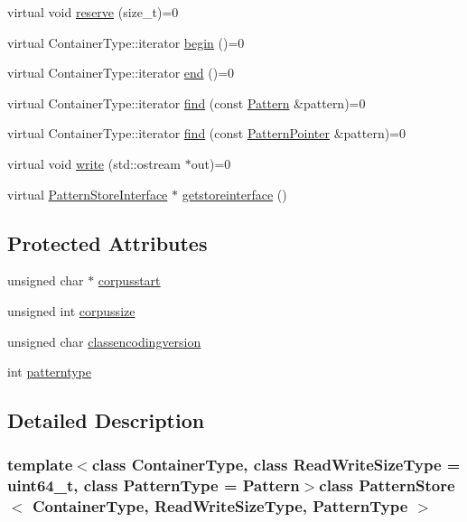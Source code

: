 \begin{DoxyCompactItemize}
\item 
virtual void \hyperlink{classPatternStore_afc995f7b88b6a31b700bb3bdb948b180}{reserve} (size\+\_\+t)=0
\item 
virtual Container\+Type\+::iterator \hyperlink{classPatternStore_aab3fab217b585b2b90a3fb3cc7065e11}{begin} ()=0
\item 
virtual Container\+Type\+::iterator \hyperlink{classPatternStore_ae697b6ba815e09fa300532a78e1c9077}{end} ()=0
\item 
virtual Container\+Type\+::iterator \hyperlink{classPatternStore_a6996798c63c2dd3ae3845848da35a6dd}{find} (const \hyperlink{classPattern}{Pattern} \&pattern)=0
\item 
virtual Container\+Type\+::iterator \hyperlink{classPatternStore_a33991d30a74b13a4264200474bf0542c}{find} (const \hyperlink{classPatternPointer}{Pattern\+Pointer} \&pattern)=0
\item 
virtual void \hyperlink{classPatternStore_a70d9b8faa5858ab7182cea7b1488a75c}{write} (std\+::ostream $\ast$out)=0
\item 
virtual \hyperlink{classPatternStoreInterface}{Pattern\+Store\+Interface} $\ast$ \hyperlink{classPatternStore_acd6094fb1e3fd4c655603dccdaed4c88}{getstoreinterface} ()
\end{DoxyCompactItemize}
\subsection*{Protected Attributes}
\begin{DoxyCompactItemize}
\item 
unsigned char $\ast$ \hyperlink{classPatternStore_a56811e603e5a5ce165a8709216f3f1c5}{corpusstart}
\item 
unsigned int \hyperlink{classPatternStore_aae8c0f162986134d629b0e6b1a63b4cc}{corpussize}
\item 
unsigned char \hyperlink{classPatternStore_a37f196867dede75f7a9bf72b07a3c24d}{classencodingversion}
\item 
int \hyperlink{classPatternStore_aa4ef383cb01f6842e97be70bea0e8c82}{patterntype}
\end{DoxyCompactItemize}


\subsection{Detailed Description}
\subsubsection*{template$<$class Container\+Type, class Read\+Write\+Size\+Type = uint64\+\_\+t, class Pattern\+Type = Pattern$>$class Pattern\+Store$<$ Container\+Type, Read\+Write\+Size\+Type, Pattern\+Type $>$}

